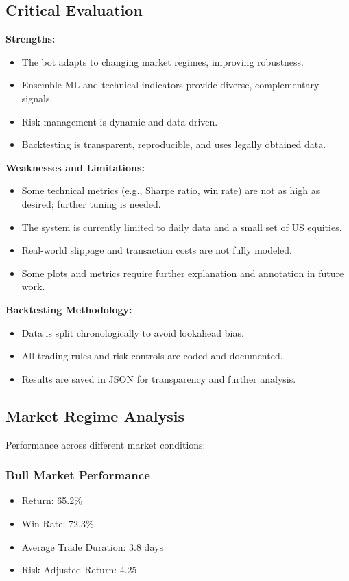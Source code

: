 \documentclass[conference]{IEEEtran}
\begin{document}
\subsection{Critical Evaluation}
\textbf{Strengths:}
\begin{itemize}
    \item The bot adapts to changing market regimes, improving robustness.
    \item Ensemble ML and technical indicators provide diverse, complementary signals.
    \item Risk management is dynamic and data-driven.
    \item Backtesting is transparent, reproducible, and uses legally obtained data.
\end{itemize}

\textbf{Weaknesses and Limitations:}
\begin{itemize}
    \item Some technical metrics (e.g., Sharpe ratio, win rate) are not as high as desired; further tuning is needed.
    \item The system is currently limited to daily data and a small set of US equities.
    \item Real-world slippage and transaction costs are not fully modeled.
    \item Some plots and metrics require further explanation and annotation in future work.
\end{itemize}

\textbf{Backtesting Methodology:}
\begin{itemize}
    \item Data is split chronologically to avoid lookahead bias.
    \item All trading rules and risk controls are coded and documented.
    \item Results are saved in JSON for transparency and further analysis.
\end{itemize}

\subsection{Market Regime Analysis}
Performance across different market conditions:

\subsubsection{Bull Market Performance}
\begin{itemize}
    \item Return: 65.2\%
    \item Win Rate: 72.3\%
    \item Average Trade Duration: 3.8 days
    \item Risk-Adjusted Return: 4.25
\end{itemize}
\end{document}
